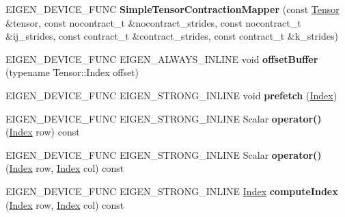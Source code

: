 \begin{DoxyCompactItemize}
E\+I\+G\+E\+N\+\_\+\+D\+E\+V\+I\+C\+E\+\_\+\+F\+U\+NC {\bfseries Simple\+Tensor\+Contraction\+Mapper} (const \hyperlink{class_eigen_1_1_tensor}{Tensor} \&tensor, const nocontract\+\_\+t \&nocontract\+\_\+strides, const nocontract\+\_\+t \&ij\+\_\+strides, const contract\+\_\+t \&contract\+\_\+strides, const contract\+\_\+t \&k\+\_\+strides)
\item 
\mbox{\label{class_eigen_1_1internal_1_1_simple_tensor_contraction_mapper_a8ac62af57a8eda84f7b792c9e98df4b0}} 
E\+I\+G\+E\+N\+\_\+\+D\+E\+V\+I\+C\+E\+\_\+\+F\+U\+NC E\+I\+G\+E\+N\+\_\+\+A\+L\+W\+A\+Y\+S\+\_\+\+I\+N\+L\+I\+NE void {\bfseries offset\+Buffer} (typename Tensor\+::\+Index offset)
\item 
\mbox{\label{class_eigen_1_1internal_1_1_simple_tensor_contraction_mapper_acb247a9e53f1b0d7ba2b8b35ac2ad166}} 
E\+I\+G\+E\+N\+\_\+\+D\+E\+V\+I\+C\+E\+\_\+\+F\+U\+NC E\+I\+G\+E\+N\+\_\+\+S\+T\+R\+O\+N\+G\+\_\+\+I\+N\+L\+I\+NE void {\bfseries prefetch} (\hyperlink{namespace_eigen_a62e77e0933482dafde8fe197d9a2cfde}{Index})
\item 
\mbox{\label{class_eigen_1_1internal_1_1_simple_tensor_contraction_mapper_ae9c096a712b45033172e5012c1f94501}} 
E\+I\+G\+E\+N\+\_\+\+D\+E\+V\+I\+C\+E\+\_\+\+F\+U\+NC E\+I\+G\+E\+N\+\_\+\+S\+T\+R\+O\+N\+G\+\_\+\+I\+N\+L\+I\+NE Scalar {\bfseries operator()} (\hyperlink{namespace_eigen_a62e77e0933482dafde8fe197d9a2cfde}{Index} row) const
\item 
\mbox{\label{class_eigen_1_1internal_1_1_simple_tensor_contraction_mapper_a31d1b85d23a41d89d7bf8d33cf4bf4fd}} 
E\+I\+G\+E\+N\+\_\+\+D\+E\+V\+I\+C\+E\+\_\+\+F\+U\+NC E\+I\+G\+E\+N\+\_\+\+S\+T\+R\+O\+N\+G\+\_\+\+I\+N\+L\+I\+NE Scalar {\bfseries operator()} (\hyperlink{namespace_eigen_a62e77e0933482dafde8fe197d9a2cfde}{Index} row, \hyperlink{namespace_eigen_a62e77e0933482dafde8fe197d9a2cfde}{Index} col) const
\item 
\mbox{\label{class_eigen_1_1internal_1_1_simple_tensor_contraction_mapper_af3a0013da744a8499302cb694b7407c4}} 
E\+I\+G\+E\+N\+\_\+\+D\+E\+V\+I\+C\+E\+\_\+\+F\+U\+NC E\+I\+G\+E\+N\+\_\+\+S\+T\+R\+O\+N\+G\+\_\+\+I\+N\+L\+I\+NE \hyperlink{namespace_eigen_a62e77e0933482dafde8fe197d9a2cfde}{Index} {\bfseries compute\+Index} (\hyperlink{namespace_eigen_a62e77e0933482dafde8fe197d9a2cfde}{Index} row, \hyperlink{namespace_eigen_a62e77e0933482dafde8fe197d9a2cfde}{Index} col) const

\end{DoxyCompactItemize}
